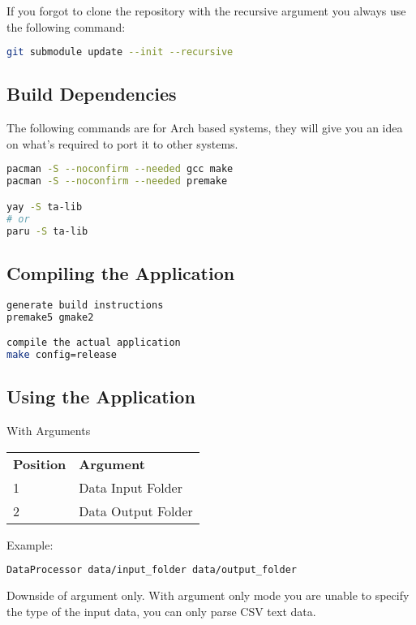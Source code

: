 \documentclass[12pt,a4paper]{article}
\begin{document}
If you forgot to clone the repository with the recursive argument you always use the following command:

\begin{lstlisting}[language=bash]
git submodule update --init --recursive
\end{lstlisting}

\subsection{Build Dependencies}

The following commands are for Arch based systems, they will give you an idea on what's required to port it to other systems.

\begin{lstlisting}[language=bash]
pacman -S --noconfirm --needed gcc make
pacman -S --noconfirm --needed premake

yay -S ta-lib
# or
paru -S ta-lib
\end{lstlisting}

\subsection{Compiling the Application}

\begin{lstlisting}[language=bash]
generate build instructions
premake5 gmake2

compile the actual application
make config=release
\end{lstlisting}

\subsection{Using the Application}

With Arguments
\begin{table}[H]
\begin{tabular}{ll}
\textbf{Position} & \textbf{Argument}  \\
1                 & Data Input Folder  \\
2                 & Data Output Folder
\end{tabular}
\end{table}

Example:
\begin{lstlisting}[language=bash]
DataProcessor data/input_folder data/output_folder
\end{lstlisting}

Downside of argument only.
With argument only mode you are unable to specify the type of the input data, you can only parse CSV text data.
\end{document}
